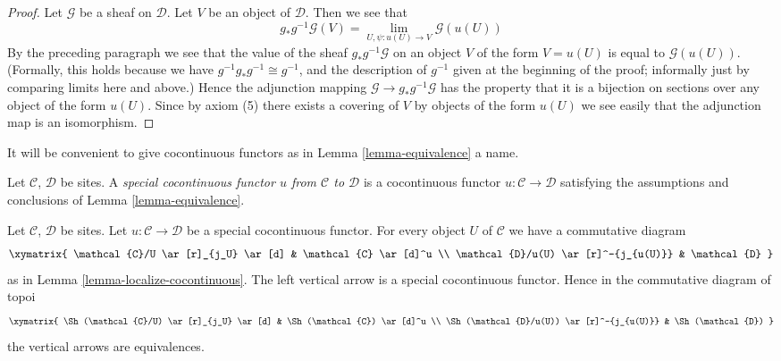 \begin{proof}
\medskip\noindent
Let $\mathcal{G}$ be a sheaf on $\mathcal{D}$. Let $V$ be an
object of $\mathcal{D}$. Then we see that
$$
g_*g^{-1}\mathcal{G}(V) =
\lim_{U, \psi : u(U) \to V} \mathcal{G}(u(U))
$$
By the preceding paragraph we see that the value of the sheaf
$g_*g^{-1}\mathcal{G}$ on an object $V$ of the form $V = u(U)$
is equal to $\mathcal{G}(u(U))$. (Formally, this holds because
we have $g^{-1}g_*g^{-1} \cong g^{-1}$, and the description
of $g^{-1}$ given at the beginning of the proof; informally just by
comparing limits here and above.)
Hence the adjunction mapping $\mathcal{G} \to g_*g^{-1}\mathcal{G}$ has
the property that it is a bijection on sections over any object of the
form $u(U)$. Since by axiom (5) there
exists a covering of $V$ by objects of the form $u(U)$ we see
easily that the adjunction map is an isomorphism.
\end{proof}

\noindent
It will be convenient to give cocontinuous functors as in
Lemma \ref{lemma-equivalence} a name.

\begin{definition}
\label{definition-special-cocontinuous-functor}
Let $\mathcal{C}$, $\mathcal{D}$ be sites.
A {\it special cocontinuous functor $u$ from $\mathcal{C}$ to $\mathcal{D}$}
is a cocontinuous functor $u : \mathcal{C} \to \mathcal{D}$ satisfying
the assumptions and conclusions of Lemma \ref{lemma-equivalence}.
\end{definition}

\begin{lemma}
\label{lemma-localize-special-cocontinuous}
Let $\mathcal{C}$, $\mathcal{D}$ be sites.
Let $u : \mathcal{C} \to \mathcal{D}$ be a special cocontinuous functor.
For every object $U$ of $\mathcal{C}$ we have a commutative diagram
$$
\xymatrix{
\mathcal{C}/U \ar[r]_{j_U} \ar[d] & \mathcal{C} \ar[d]^u \\
\mathcal{D}/u(U) \ar[r]^-{j_{u(U)}} & \mathcal{D}
}
$$
as in Lemma \ref{lemma-localize-cocontinuous}.
The left vertical arrow is a special cocontinuous functor.
Hence in the commutative diagram of topoi
$$
\xymatrix{
\Sh(\mathcal{C}/U) \ar[r]_{j_U} \ar[d] &
\Sh(\mathcal{C}) \ar[d]^u \\
\Sh(\mathcal{D}/u(U)) \ar[r]^-{j_{u(U)}} &
\Sh(\mathcal{D})
}
$$
the vertical arrows are equivalences.
\end{lemma}

